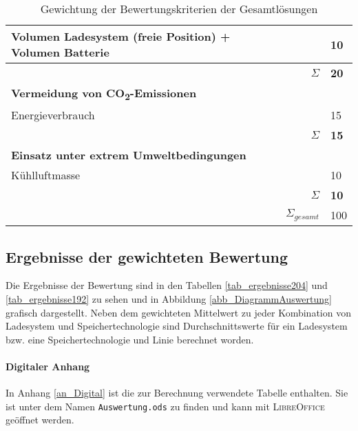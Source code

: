 \begin{table}
\begin{tabularx}{\linewidth}{Xrl}
		Volumen Ladesystem (freie Position) + Volumen Batterie   &                   & 10              \\ \midrule
		                                                         &          $\Sigma$ & \textbf{20}     \\
		\textbf{Vermeidung von CO\textsubscript{2}-Emissionen}   &                   &  \\
		Energieverbrauch                                         &                   & 15              \\ \midrule
		                                                         &          $\Sigma$ & \textbf{15}     \\
		\textbf{Einsatz unter extrem Umweltbedingungen}          &                   &  \\
		Kühlluftmasse                                            &                   & 10              \\ \midrule
		                                                         &          $\Sigma$ & \textbf{10}     \\ \midrule
		                                                         & $\Sigma_{gesamt}$ & 100             \\ \bottomrule
	\end{tabularx}
	\caption{Gewichtung der Bewertungskriterien der Gesamtlösungen}
	\label{tab_bewertungskriterien}
\end{table} 

\subsection{Ergebnisse der gewichteten Bewertung}
Die Ergebnisse der Bewertung sind in den Tabellen \ref{tab_ergebnisse204} und \ref{tab_ergebnisse192} zu sehen und in Abbildung \ref{abb_DiagrammAuswertung} grafisch dargestellt. Neben dem gewichteten Mittelwert zu jeder Kombination von Ladesystem und Speichertechnologie sind Durchschnittswerte für ein Ladesystem bzw. eine Speichertechnologie und Linie berechnet worden.

\paragraph{Digitaler Anhang} In Anhang \ref{an_Digital} ist die zur Berechnung verwendete Tabelle enthalten. Sie ist unter dem Namen \texttt{Auswertung.ods} zu finden und kann mit \textsc{LibreOffice} geöffnet werden.

